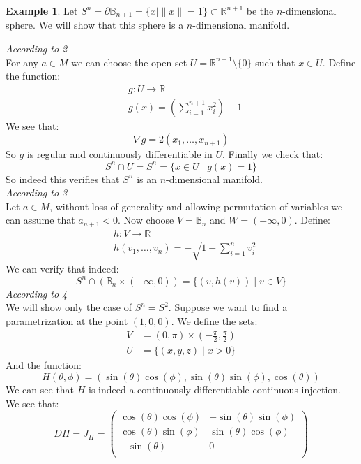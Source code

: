 \documentclass[11pt,a4paper]{article}
\theoremstyle{definition}
\newtheorem{example}{Example}[section]
\theoremstyle{plain}
\newcommand{\R}{\mathbb{R}}
\begin{document}
	\begin{example}
		Let $S^n = \partial \mathbb{B}_{n+1} = \{x \mid \|x\| = 1\} \subset 
		\R^{n+1}$ be the $n$-dimensional sphere. We will show that this
		sphere is a $n$-dimensional manifold.
	\end{example}
	\noindent
	\emph{According to 2} \\
	For any $a \in M$ we can choose the open set 
	$U = \R^{n+1} \setminus \{0\}$ such that $x \in U$. Define the function:
	\begin{align*}
		&g \colon U \to \R \\
		&g(x) = \left(\sum_{i=1}^{n+1}{x_i^2}\right) - 1
	\end{align*}
	We see that:
	\[
		\nabla g = 2(x_1,\dots,x_{n+1})
	\]
	So $g$ is regular and continuously differentiable in $U$. Finally we
	check that:
	\[
		S^n \cap U = S^n = \{x \in U \mid g(x) = 1\}
	\]
	So indeed this verifies that $S^n$ is an $n$-dimensional manifold. \\
	\noindent
	\emph{According to 3} \\
	Let $a \in M$, without loss of generality and allowing permutation
	of variables we can assume that $a_{n+1} < 0$. Now choose 
	$V = \mathbb{B}_n$ and $W = (-\infty,0)$. Define:
	\begin{align*}
		&h \colon V \to \R \\
		&h(v_1,\dots,v_n) = - \sqrt{1 - \sum_{i=1}^{n}{v_i^2}}
	\end{align*}
	We can verify that indeed:
	\[
		S^n \cap (\mathbb{B}_n \times (-\infty,0)) = \{(v,h(v)) \mid v \in V\}
	\]
	\emph{According to 4} \\
	We will show only the case of $S^n = S^2$. Suppose we want to find
	a parametrization at the point $(1,0,0)$. We define the sets:
	\begin{align*}
		V &= (0,\pi) \times \left(-\frac{\pi}{2}, \frac{\pi}{2}\right) \\
		U &= \{(x,y,z) \mid x > 0\}
	\end{align*}
	And the function:
	\[
		H(\theta, \phi) = 
		(\sin(\theta)\cos(\phi),\sin(\theta)\sin(\phi),\cos(\theta))
	\]
	We can see that $H$ is indeed a continuously differentiable continuous
	injection. We see that:
	\[
		DH = J_H = \begin{pmatrix}
					\cos(\theta)\cos(\phi) & -\sin(\theta)\sin(\phi)\\
					\cos(\theta)\sin(\phi) & \sin(\theta)\cos(\phi)\\
					-\sin(\theta) & 0\\
					\end{pmatrix}
	\]
\end{document}
